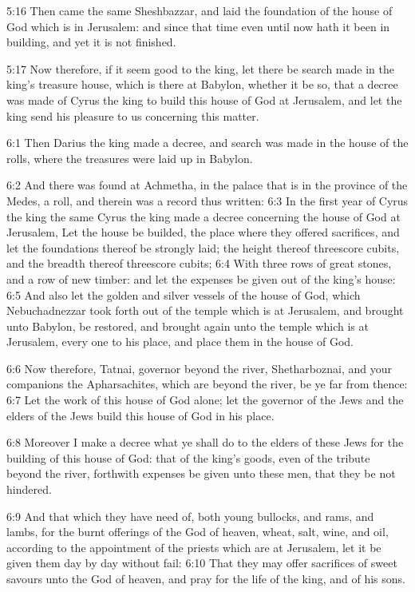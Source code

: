 5:16 Then came the same Sheshbazzar, and laid the foundation of the house of God which is in Jerusalem: and since that time even until now hath it been in building, and yet it is not finished.

5:17 Now therefore, if it seem good to the king, let there be search made in the king's treasure house, which is there at Babylon, whether it be so, that a decree was made of Cyrus the king to build this house of God at Jerusalem, and let the king send his pleasure to us concerning this matter.

6:1 Then Darius the king made a decree, and search was made in the house of the rolls, where the treasures were laid up in Babylon.

6:2 And there was found at Achmetha, in the palace that is in the province of the Medes, a roll, and therein was a record thus written: 6:3 In the first year of Cyrus the king the same Cyrus the king made a decree concerning the house of God at Jerusalem, Let the house be builded, the place where they offered sacrifices, and let the foundations thereof be strongly laid; the height thereof threescore cubits, and the breadth thereof threescore cubits; 6:4 With three rows of great stones, and a row of new timber: and let the expenses be given out of the king's house: 6:5 And also let the golden and silver vessels of the house of God, which Nebuchadnezzar took forth out of the temple which is at Jerusalem, and brought unto Babylon, be restored, and brought again unto the temple which is at Jerusalem, every one to his place, and place them in the house of God.

6:6 Now therefore, Tatnai, governor beyond the river, Shetharboznai, and your companions the Apharsachites, which are beyond the river, be ye far from thence: 6:7 Let the work of this house of God alone; let the governor of the Jews and the elders of the Jews build this house of God in his place.

6:8 Moreover I make a decree what ye shall do to the elders of these Jews for the building of this house of God: that of the king's goods, even of the tribute beyond the river, forthwith expenses be given unto these men, that they be not hindered.

6:9 And that which they have need of, both young bullocks, and rams, and lambs, for the burnt offerings of the God of heaven, wheat, salt, wine, and oil, according to the appointment of the priests which are at Jerusalem, let it be given them day by day without fail: 6:10 That they may offer sacrifices of sweet savours unto the God of heaven, and pray for the life of the king, and of his sons.

